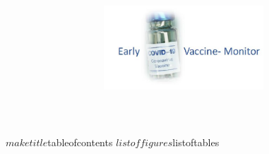 \documentclass{article}
\title{\includegraphics[width=6cm]{ECVM.jpg}}
\author{${titolo_documento}}
\begin{document}
\thispagestyle{empty}
$maketitle
$tableofcontents
$listoffigures
$listoftables
\end{document}
